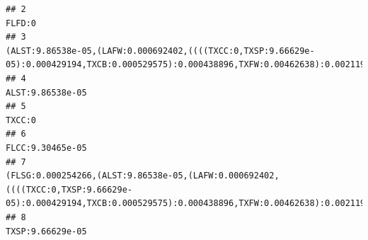 \documentclass[]{article}
\begin{document}
\begin{verbatim}
## 2                                                                                                                                                                                                                                                                                                                                                                                                                             FLFD:0
## 3                                                                                                                                                                                                                                        (ALST:9.86538e-05,(LAFW:0.000692402,((((TXCC:0,TXSP:9.66629e-05):0.000429194,TXCB:0.000529575):0.000438896,TXFW:0.00462638):0.0021191,ALFW:0.000685147):0.000263869):0.00044979):0.00272304
## 4                                                                                                                                                                                                                                                                                                                                                                                                                   ALST:9.86538e-05
## 5                                                                                                                                                                                                                                                                                                                                                                                                                             TXCC:0
## 6                                                                                                                                                                                                                                                                                                                                                                                                                   FLCC:9.30465e-05
## 7                                                                                                                                                                                                         (FLSG:0.000254266,(ALST:9.86538e-05,(LAFW:0.000692402,((((TXCC:0,TXSP:9.66629e-05):0.000429194,TXCB:0.000529575):0.000438896,TXFW:0.00462638):0.0021191,ALFW:0.000685147):0.000263869):0.00044979):0.00272304):0.000116498
## 8                                                                                                                                                                                                                                                                                                                                                                                                                   TXSP:9.66629e-05

\end{verbatim}
\end{document}
